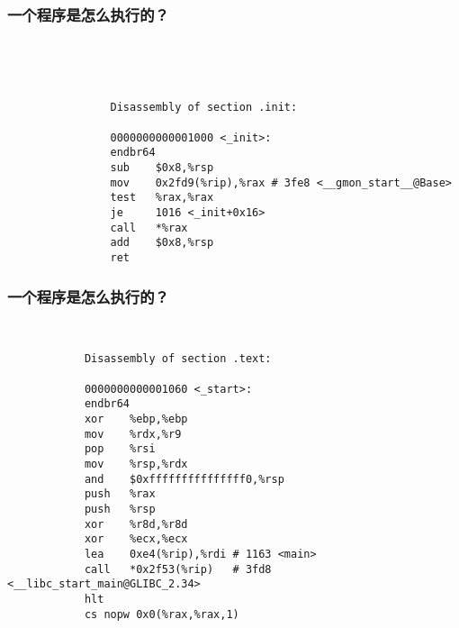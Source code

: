 \documentclass[UTF8,lualatex]{ctexbeamer}
\begin{document}
\begin{frame}[fragile]
    \frametitle{一个程序是怎么执行的？}
    \scriptsize
        \begin{block}{~}
        \end{block}
        \begin{block}{~}
            \begin{verbatim}
                Disassembly of section .init:

                0000000000001000 <_init>:
                endbr64
                sub    $0x8,%rsp
                mov    0x2fd9(%rip),%rax # 3fe8 <__gmon_start__@Base>
                test   %rax,%rax
                je     1016 <_init+0x16>
                call   *%rax
                add    $0x8,%rsp
                ret
            \end{verbatim}
        \end{block}
\end{frame}


\begin{frame}[fragile]
    \frametitle{一个程序是怎么执行的？}
    \scriptsize
    \begin{block}{~}
        \begin{verbatim}
            Disassembly of section .text:

            0000000000001060 <_start>:
            endbr64
            xor    %ebp,%ebp
            mov    %rdx,%r9
            pop    %rsi
            mov    %rsp,%rdx
            and    $0xfffffffffffffff0,%rsp
            push   %rax
            push   %rsp
            xor    %r8d,%r8d
            xor    %ecx,%ecx
            lea    0xe4(%rip),%rdi # 1163 <main>
            call   *0x2f53(%rip)   # 3fd8 <__libc_start_main@GLIBC_2.34>
            hlt
            cs nopw 0x0(%rax,%rax,1)
        \end{verbatim}
    \end{block}
\end{frame}

\end{document}

